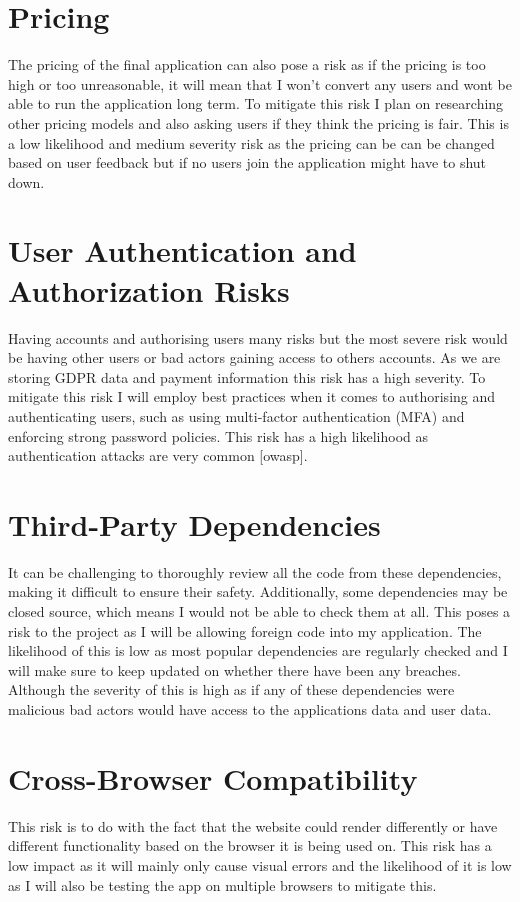 \documentclass[]{project_report}
\begin{document}
\section{Pricing}
The pricing of the final application can also pose a risk as if the pricing is too high or too unreasonable, it will mean that I won't convert any users and wont be able to run the application long term. To mitigate this risk I plan on researching other pricing models and also asking users if they think the pricing is fair. This is a low likelihood  and medium severity risk as the pricing can be can be changed based on user feedback but if no users join the application might have to shut down.


\section{User Authentication and Authorization Risks}
Having accounts and authorising users many risks but the most severe risk would be having other users or bad actors gaining access to others accounts. As we are storing GDPR data and payment information this risk has a high severity. To mitigate this risk I will employ best practices when it comes to authorising and authenticating users, such as using multi-factor authentication (MFA) and enforcing strong password policies. This risk has a high likelihood as authentication attacks are very common [owasp].

\section{Third-Party Dependencies}

It can be challenging to thoroughly review all the code from these dependencies, making it difficult to ensure their safety. Additionally, some dependencies may be closed source, which means I would not be able to check them at all. This poses a risk to the project as I will be allowing foreign code into my application. The likelihood of this is low as most popular dependencies are regularly checked and I will make sure to keep updated on whether there have been any breaches. Although the severity of this is high as if any of these dependencies were malicious bad actors would have access to the applications data and user data.

\section{Cross-Browser Compatibility}
This risk is to do with the fact that the website could render differently or have different functionality based on the browser it is being used on. This risk has a low impact as it will mainly only cause visual errors and the likelihood of it is low as I will also be testing the app on multiple browsers to mitigate this. 
\end{document}
